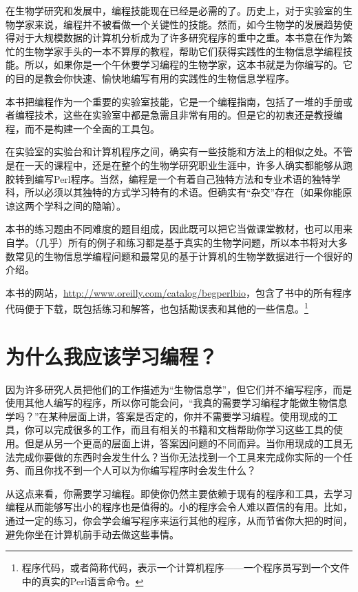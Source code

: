 在生物学研究和发展中，编程技能现在已经是必需的了。历史上，对于实验室的生物学家来说，编程并不被看做一个关键性的技能。然而，如今生物学的发展趋势使得对于大规模数据的计算机分析成为了许多研究程序的重中之重。本书意在作为繁忙的生物学家手头的一本不算厚的教程，帮助它们获得实践性的生物信息学编程技能。所以，如果你是一个午休要学习编程的生物学家，这本书就是为你编写的。它的目的是教会你快速、愉快地编写有用的实践性的生物信息学程序。

本书把编程作为一个重要的实验室技能，它是一个编程指南，包括了一堆的手册或者编程技术，这些在实验室中都是急需且非常有用的。但是它的初衷还是教授编程，而不是构建一个全面的工具包。

在实验室的实验台和计算机程序之间，确实有一些技能和方法上的相似之处。不管是在一天的课程中，还是在整个的生物学研究职业生涯中，许多人确实都能够从跑胶转到编写Perl程序。当然，编程是一个有着自己独特方法和专业术语的独特学科，所以必须以其独特的方式学习特有的术语。但确实有“杂交”存在（如果你能原谅这两个学科之间的隐喻）。

本书的练习题由不同难度的题目组成，因此既可以把它当做课堂教材，也可以用来自学。（几乎）所有的例子和练习都是基于真实的生物学问题，所以本书将对大多数常见的生物信息学编程问题和最常见的基于计算机的生物学数据进行一个很好的介绍。

本书的网站，\href{http://www.oreilly.com/catalog/begperlbio}{http://www.oreilly.com/catalog/begperlbio}，包含了书中的所有程序代码便于下载，既包括练习和解答，也包括勘误表和其他的一些信息。\footnote{程序代码，或者简称代码，表示一个计算机程序——一个程序员写到一个文件中的真实的Perl语言命令。}

\section*{为什么我应该学习编程？}
因为许多研究人员把他们的工作描述为“生物信息学”，但它们并不编写程序，而是使用其他人编写的程序，所以你可能会问，“我真的需要学习编程才能做生物信息学吗？”在某种层面上讲，答案是否定的，你并不需要学习编程。使用现成的工具，你可以完成很多的工作，而且有相关的书籍和文档帮助你学习这些工具的使用。但是从另一个更高的层面上讲，答案因问题的不同而异。当你用现成的工具无法完成你要做的东西时会发生什么？当你无法找到一个工具来完成你实际的一个任务、而且你找不到一个人可以为你编写程序时会发生什么？

从这点来看，你需要学习编程。即使你仍然主要依赖于现有的程序和工具，去学习编程从而能够写出小的程序也是值得的。小的程序会令人难以置信的有用。比如，通过一定的练习，你会学会编写程序来运行其他的程序，从而节省你大把的时间，避免你坐在计算机前手动去做这些事情。

